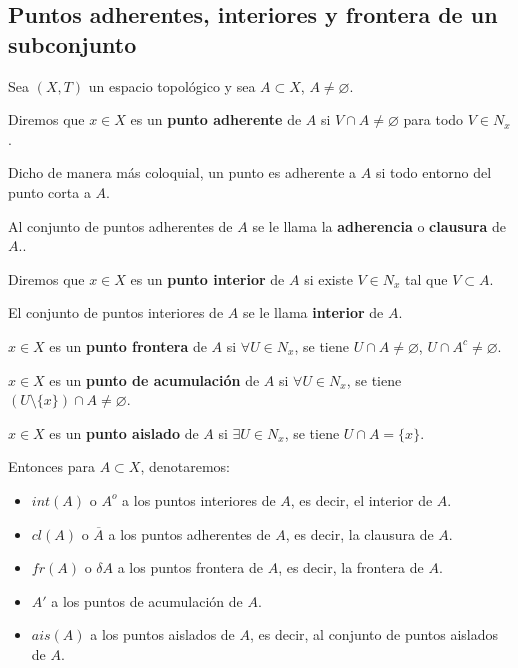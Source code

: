 \subsection{Puntos adherentes, interiores y frontera de un subconjunto}
Sea $(X,T)$ un espacio topológico y sea $A \subset X$, $A \neq \varnothing$.
\begin{ndef}
    Diremos que $x \in X$ es un \textbf{punto adherente} de $A$ si $V \cap A \neq \varnothing$ para todo $V \in N_x$.
\end{ndef}
\begin{note}
Dicho de manera más coloquial, un punto es adherente a $A$ si todo entorno del punto corta a $A$.
\end{note}
\begin{ndef}
    Al conjunto de puntos adherentes de $A$ se le llama la \textbf{adherencia} o \textbf{clausura} de $A$..
\end{ndef}
\begin{ndef}
    Diremos que $x \in X$ es un \textbf{punto interior} de $A$ si existe $V \in N_x$ tal que $V \subset A$.
\end{ndef}
\begin{ndef}
    El conjunto de puntos interiores de $A$ se le llama \textbf{interior} de $A$.
\end{ndef}
\begin{ndef}
  $x \in X$ es un \textbf{punto frontera} de $A$ si $\forall U \in N_x$, se tiene $U \cap A \neq \varnothing $, $U \cap A^c \neq \varnothing $.
\end{ndef}
\begin{ndef}
  $x \in X$ es un \textbf{punto de acumulación} de $A$ si $\forall U \in N_x$, se tiene $(U\setminus \{x\}) \cap A \neq \varnothing $.
\end{ndef}
\begin{ndef}
  $x \in X$ es un \textbf{punto aislado} de $A$ si $\exists U \in N_x$, se tiene $U \cap A = \{x\} $.
\end{ndef}

Entonces para $A \subset X$, denotaremos:
\begin{itemize}
  \item $int(A)$ o $A^o$ a los puntos interiores de $A$, es decir, el interior de $A$.
  \item $cl(A)$ o $\overline{A}$ a los puntos adherentes de $A$, es decir, la clausura de $A$.
  \item $fr(A)$ o $\delta A$ a los puntos frontera de $A$, es decir, la frontera de $A$.
  \item $A'$ a los puntos de acumulación de $A$.
  \item $ais(A)$ a los puntos aislados de $A$, es decir, al conjunto de puntos aislados de $A$.
\end{itemize}


